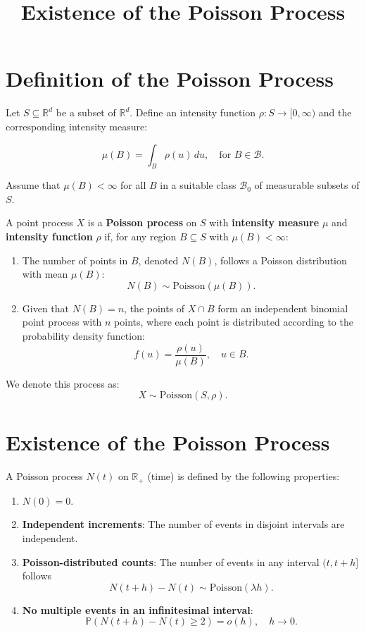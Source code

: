\documentclass{article}
\begin{document}
\title{Existence of the Poisson Process}
\author{}
\date{}
\maketitle

\section*{Definition of the Poisson Process}

Let \( S \subseteq \mathbb{R}^d \) be a subset of \( \mathbb{R}^d \).  
Define an intensity function \( \rho: S \to [0, \infty) \) and the corresponding intensity measure:

\[
\mu(B) = \int_B \rho(u) \, du, \quad \text{for } B \in \mathcal{B}.
\]

Assume that \( \mu(B) < \infty \) for all \( B \) in a suitable class \( \mathcal{B}_0 \) of measurable subsets of \( S \).  

A point process \( X \) is a \textbf{Poisson process} on \( S \) with \textbf{intensity measure} \( \mu \) and \textbf{intensity function} \( \rho \) if, for any region \( B \subseteq S \) with \( \mu(B) < \infty \):

\begin{enumerate}
    \item The number of points in \( B \), denoted \( N(B) \), follows a Poisson distribution with mean \( \mu(B) \):
    \[
    N(B) \sim \text{Poisson}(\mu(B)).
    \]
    \item Given that \( N(B) = n \), the points of \( X \cap B \) form an independent binomial point process with \( n \) points, where each point is distributed according to the probability density function:
    \[
    f(u) = \frac{\rho(u)}{\mu(B)}, \quad u \in B.
    \]
\end{enumerate}

We denote this process as:
\[
X \sim \text{Poisson}(S, \rho).
\]

\section*{Existence of the Poisson Process}

A Poisson process \( N(t) \) on \( \mathbb{R}_+ \) (time) is defined by the following properties:

\begin{enumerate}
    \item \( N(0) = 0 \).
    \item \textbf{Independent increments}: The number of events in disjoint intervals are independent.
    \item \textbf{Poisson-distributed counts}: The number of events in any interval \( (t, t+h] \) follows
    \[
    N(t+h) - N(t) \sim \text{Poisson}(\lambda h).
    \]
    \item \textbf{No multiple events in an infinitesimal interval}:
    \[
    \mathbb{P}(N(t+h) - N(t) \geq 2) = o(h), \quad h \to 0.
    \]
\end{enumerate}
\end{document}
